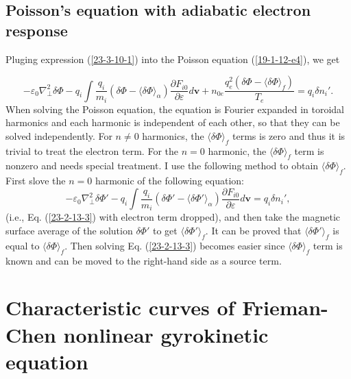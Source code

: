 \documentclass{llncs}
\begin{document}
\subsection{Poisson's equation with adiabatic electron response}

Pluging expression (\ref{23-3-10-1}) into the Poisson equation
(\ref{19-1-12-e4}), we get


\begin{equation}
  \label{23-2-13-3} - \varepsilon_0 \nabla^2_{\perp} \delta \Phi - q_i \int
  \frac{q_i}{m_i} (\delta \Phi - \langle \delta \Phi \rangle_{\alpha})
  \frac{\partial F_{i 0}}{\partial \varepsilon} d\mathbf{v}+ n_{0 e}
  \frac{q_e^2 (\delta \Phi - \langle \delta \Phi \rangle_f)}{T_e} = q_i \delta
  n_i' .
\end{equation}
When solving the Poisson equation, the equation is Fourier expanded in
toroidal harmonics and each harmonic is independent of each other, so that
they can be solved independently. For $n \neq 0$ harmonics, the $\langle
\delta \Phi \rangle_f$ terms is zero and thus it is trivial to treat the
electron term. For the $n = 0$ harmonic, the $\langle \delta \Phi \rangle_f$
term is nonzero and needs special treatment. I use the following method to
obtain $\langle \delta \Phi \rangle_f$. First slove the $n = 0$ harmonic of
the following equation:
\begin{equation}
  - \varepsilon_0 \nabla^2_{\perp} \delta \Phi' - q_i \int \frac{q_i}{m_i}
  (\delta \Phi' - \langle \delta \Phi' \rangle_{\alpha}) \frac{\partial F_{i
  0}}{\partial \varepsilon} d\mathbf{v}= q_i \delta n_i',
\end{equation}
(i.e., Eq. (\ref{23-2-13-3}) with electron term dropped), and then take the
magnetic surface average of the solution $\delta \Phi'$ to get $\langle \delta
\Phi' \rangle_f$. It can be proved that $\langle \delta \Phi' \rangle_f$ is
equal to $\langle \delta \Phi \rangle_f$. Then solving Eq. (\ref{23-2-13-3})
becomes easier since $\langle \delta \Phi \rangle_f$ term is known and can be
moved to the right-hand side as a source term.

\section{Characteristic curves of Frieman-Chen nonlinear gyrokinetic equation}
\end{document}
